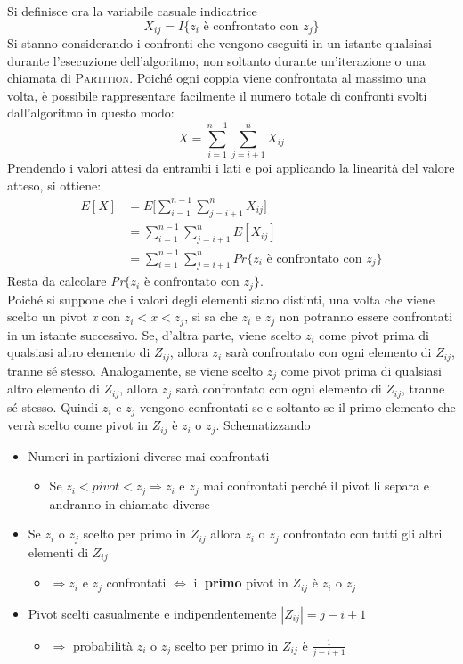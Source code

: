 \documentclass[10pt, a4paper]{report}
\begin{document}
Si definisce ora la variabile casuale indicatrice
\begin{equation*}
X_{ij} = I\{ z_i \text{ è confrontato con } z_j\}
\end{equation*}
Si stanno considerando i confronti che vengono eseguiti in un istante qualsiasi durante l'esecuzione dell'algoritmo, non soltanto durante un'iterazione o una chiamata di \textsc{Partition}. Poiché ogni coppia viene confrontata al massimo una volta, è possibile rappresentare facilmente il numero totale di confronti svolti dall'algoritmo in questo modo:
\begin{equation*}
X = \sum_{i=1}^{n-1}\sum_{j=i+1}^{n}X_{ij}
\end{equation*}
Prendendo i valori attesi da entrambi i lati e poi applicando la linearità del valore atteso, si ottiene:
\begin{align*}
E[X] &= E\Biggl[\sum_{i=1}^{n-1}\sum_{j=i+1}^{n}X_{ij}\Biggr] \\
&= \sum_{i=1}^{n-1}\sum_{j=i+1}^{n}E[X_{ij}] \\
&= \sum_{i=1}^{n-1}\sum_{j=i+1}^{n} Pr\{z_i \text{ è confrontato con } z_j\}
\end{align*}
Resta da calcolare \textit{Pr}$\{z_i \text{ è confrontato con } z_j\}$.\\Poiché si suppone che i valori degli elementi siano distinti, una volta che viene scelto un pivot \textit{x} con $z_i < x < z_j$, si sa che $z_i$ e $z_j$ non potranno essere confrontati in un istante successivo. Se, d'altra parte, viene scelto $z_i$ come pivot prima di qualsiasi altro elemento di $Z_{ij}$, allora $z_i$ sarà confrontato con ogni elemento di $Z_{ij}$, tranne sé stesso. Analogamente, se viene scelto $z_j$ come pivot prima di qualsiasi altro elemento di $Z_{ij}$, allora $z_j$ sarà confrontato con ogni elemento di $Z_{ij}$, tranne sé stesso. Quindi $z_i$ e $z_j$ vengono confrontati se e soltanto se il primo elemento che verrà scelto come pivot in $Z_{ij}$ è $z_i$ o $z_j$. Schematizzando
\begin{itemize}
\item Numeri in partizioni diverse mai confrontati
\begin{itemize}
\item[]Se $z_i < pivot < z_j \Rightarrow z_i$ e $z_j$ mai confrontati perché il pivot li separa e andranno in chiamate diverse
\end{itemize}
\item Se $z_i$ o $z_j$ scelto per primo in $Z_{ij}$ allora $z_i$ o $z_j$ confrontato con tutti gli altri elementi di $Z_{ij}$
\begin{itemize}
\item[]$\Rightarrow z_i$ e $z_j$ confrontati $\Leftrightarrow$ il \textbf{primo} pivot in $Z_{ij}$ è $z_i$ o $z_j$
\end{itemize}
\item Pivot scelti casualmente e indipendentemente $|Z_{ij}| = j - i + 1$
\begin{itemize}
\item[]$\Rightarrow$ probabilità $z_i$ o $z_j$ scelto per primo in $Z_{ij}$ è $\frac{1}{j-i+1}$
\end{itemize}
\end{itemize}
\end{document}
